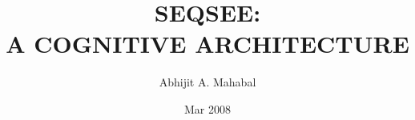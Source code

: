 \title{SEQSEE: \\ A COGNITIVE ARCHITECTURE}
\author{Abhijit A. Mahabal}
\date{Mar 2008}

\renewcommand{\maketitlehookc}{\vfill\begin{center} 
Submitted to the faculty of the University Graduate School \\
in partial fulfillment of the requirements\\
for the degree\\
Doctor of Philosophy\\
in the Department of Cognitive Science,\\
 and\\
in the Department of Computer Science,\\
Indiana University
 \end{center}\vskip0.8in}

\renewcommand{\maketitlehookd}{\vskip1in}

\maketitle\thispagestyle{empty}

